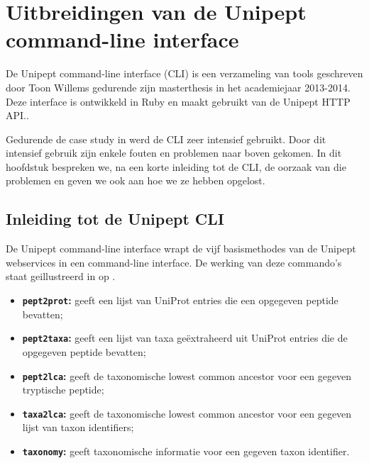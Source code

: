 \chapter{Uitbreidingen van de Unipept command-line interface}
\label{chap:cli}

De Unipept command-line interface\cite{toonthesis} (CLI) is een verzameling van
tools geschreven door Toon Willems gedurende zijn masterthesis in het
academiejaar 2013-2014. Deze interface is ontwikkeld in Ruby en maakt gebruikt
van de Unipept HTTP API.\cite{Unipeptapi}.

Gedurende de case study in  werd de CLI zeer intensief
gebruikt. Door dit intensief gebruik zijn enkele fouten en problemen naar boven
gekomen. In dit hoofdstuk bespreken we, na een korte inleiding tot de CLI, de
oorzaak van die problemen en geven we ook aan hoe we ze hebben opgelost.

\section{Inleiding tot de Unipept CLI}
De Unipept command-line interface wrapt de vijf basismethodes van de 
Unipept webservices\cite{Unipeptapi} in een command-line interface. De werking 
van deze commando's staat geillustreerd in  op 
.

\begin{itemize}
\item \textbf{\texttt{pept2prot}:} geeft een lijst van UniProt entries 
die een opgegeven peptide bevatten;
\item \textbf{\texttt{pept2taxa}:} geeft een lijst van taxa geëxtraheerd uit 
UniProt entries die de opgegeven peptide bevatten;
\item \textbf{\texttt{pept2lca}:} geeft de taxonomische lowest common ancestor 
voor een gegeven tryptische peptide;
\item \textbf{\texttt{taxa2lca}:} geeft de taxonomische lowest common ancestor 
voor een gegeven lijst van taxon identifiers;
\item \textbf{\texttt{taxonomy}:} geeft taxonomische informatie voor een 
gegeven taxon identifier.
\end{itemize}

